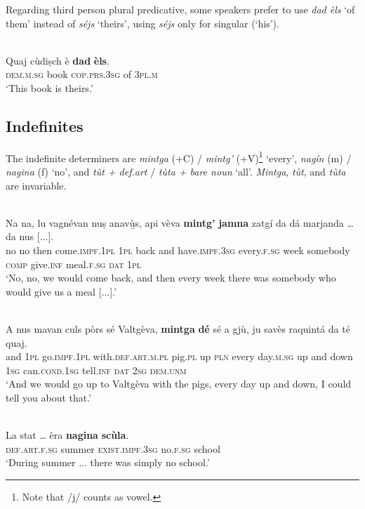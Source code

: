 Regarding third person plural predicative, some speakers prefer to use \textit{dad èls} `of them' instead of \textit{séjs} `theirs', using \textit{séjs} only for singular (`his').

\ea

\\
\gll Quaj cùdiṣch è \textbf{dad} \textbf{èls}.\\
\textsc{dem.m.sg} book \textsc{cop.prs.3sg} of \textsc{3pl.m}\\
\glt `This book is theirs.'
\z




\subsection{Indefinites}
The indefinite determiners are \textit{mintga} (+\textsc{C}) / \textit{mintg'} (+\textsc{V})\footnote{Note that /j/ counts as vowel.} `every', \textit{nagín} (m) / \textit{nagina} (f) `no', and \textit{tùt + def.art} / \textit{tùta + bare noun} `all'. \textit{Mintga}, \textit{tùt}, and \textit{tùta} are invariable.

\ea
{}\\
\gll Na na, lu vagnévan nuṣ anavù̱s, api vèva \textbf{mintg’} \textbf{jamna} zatgí da dá marjanda … da nus [...].\\
no no then come.\textsc{impf.1pl} \textsc{1pl} back and have.\textsc{impf.3sg} every.\textsc{f.sg}  week somebody \textsc{comp} give.\textsc{inf} meal.\textsc{f.sg} {} \textsc{dat} \textsc{1pl}\\
\glt `No, no, we would come back, and then every week there was somebody who would give us a meal [...].'
\z

\ea

\\
\gll    A nus mavan culs pòrs sé Valtgèva, \textbf{mintga} \textbf{dé} sé a gjù, ju savès raquintá da té quaj.\\
and \textsc{1pl}  go.\textsc{impf.1pl} with.\textsc{def.art.m.pl} pig.\textsc{pl} up \textsc{pln} every day.\textsc{m.sg} up and down  \textsc{1sg}  can.\textsc{cond.1sg}  tell.\textsc{inf}  \textsc{dat}  \textsc{2sg} \textsc{dem.unm}\\
\glt `And we would go up to Valtgèva with the pigs, every day up and down, I could tell you about that.'
\z

\ea

\\
\gll La stat … èra \textbf{nagina} \textbf{scùla}.  \\
\textsc{def.art.f.sg} summer {} \textsc{exist.impf.3sg} no.\textsc{f.sg} school \\
\glt `During summer ... there was simply no school.'
\z

